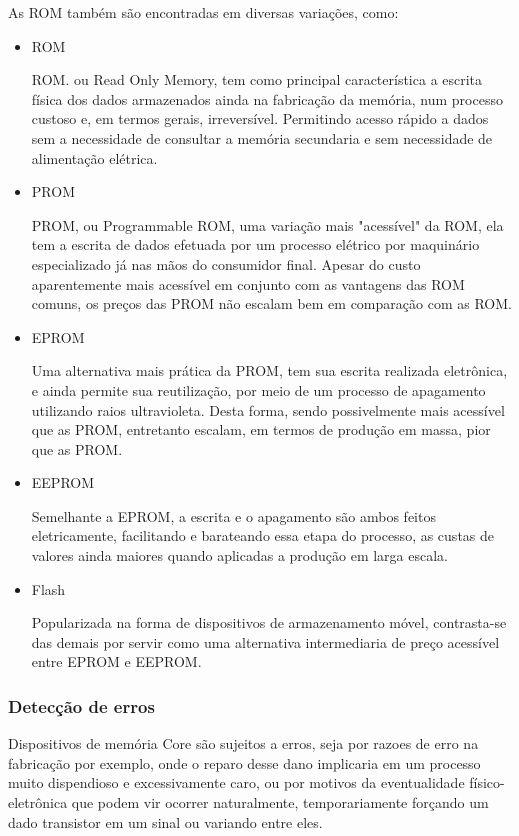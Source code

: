 \documentclass[12pt]{article}
\begin{document}
As ROM também são encontradas em diversas variações, como:

\begin{itemize}
    \item ROM 

    ROM. ou Read Only Memory, tem como principal característica a escrita física dos dados armazenados ainda na fabricação da memória, num processo custoso e, em termos gerais, irreversível. Permitindo acesso rápido a dados sem a necessidade de consultar a memória secundaria e sem necessidade de alimentação elétrica.

    \item PROM

    PROM, ou Programmable ROM, uma variação mais "acessível" da ROM, ela tem a escrita de dados efetuada por um processo elétrico por maquinário especializado já nas mãos do consumidor final. Apesar do custo aparentemente mais acessível em conjunto com as vantagens das ROM comuns, os preços das PROM não escalam bem em comparação com as ROM.

    \item EPROM

    Uma alternativa mais prática da PROM, tem sua escrita realizada eletrônica, e ainda permite sua reutilização, por meio de um processo de apagamento utilizando raios ultravioleta. Desta forma, sendo possivelmente mais acessível que as PROM, entretanto escalam, em termos de produção em massa, pior que as PROM.

    \item EEPROM

    Semelhante a EPROM, a escrita e o apagamento são ambos feitos eletricamente, facilitando e barateando essa etapa do processo, as custas de valores ainda maiores quando aplicadas a produção em larga escala.

    \item Flash

    Popularizada na forma de dispositivos de armazenamento móvel, contrasta-se das demais por servir como uma alternativa intermediaria de preço acessível entre EPROM e EEPROM.

\end{itemize}

\subsubsection*{Detecção de erros}
Dispositivos de memória Core são sujeitos a erros, seja por razoes de erro na fabricação por exemplo, onde o reparo desse dano implicaria em um processo muito dispendioso e excessivamente caro, ou por motivos da eventualidade físico-eletrônica que podem vir ocorrer naturalmente, temporariamente forçando um dado transistor em um sinal ou variando entre eles. 
\end{document}
